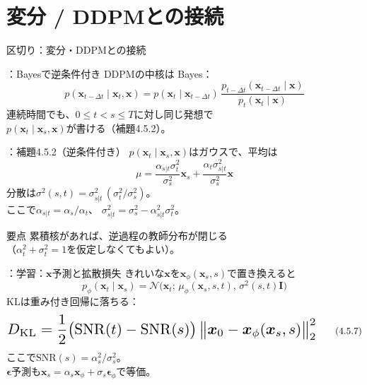 \section{変分 / DDPMとの接続}
\assuppl
\begin{frame}{区切り：\supplmark\;変分・DDPMとの接続}
    \tableofcontents[currentsection]
\end{frame}
\assuppl
\begin{frame}{\supplmark：Bayesで逆条件付き}
    DDPMの中核は Bayes：
    \[
        p(\bm{x}_{t-\Delta t}\mid\bm{x}_t,\bm{x})
        =
        p(\bm{x}_t\mid\bm{x}_{t-\Delta t})\,
        \dfrac{p_{t-\Delta t}(\bm{x}_{t-\Delta t}\mid\bm{x})}{p_t(\bm{x}_t\mid\bm{x})}
        \tag{4.5.3}
    \]
    連続時間でも、$0\le t<s\le T$に対し同じ発想で\\
    $p(\bm{x}_t\mid\bm{x}_s,\bm{x})$が書ける（補題4.5.2）。
\end{frame}
\assuppl
\begin{frame}{\supplmark：補題4.5.2（逆条件付き）}
    $p(\bm{x}_t\mid\bm{x}_s,\bm{x})$はガウスで、平均は
    \[
        \mu
        =
        \dfrac{\alpha_{s|t}\sigma_t^{2}}{\sigma_s^{2}}\bm{x}_s
        +
        \dfrac{\alpha_t\sigma_{s|t}^{2}}{\sigma_s^{2}}\bm{x}
    \]
    分散は$\sigma^{2}(s,t)=\sigma_{s|t}^{2}\,(\sigma_t^{2}/\sigma_s^{2})$。\\
    ここで$\alpha_{s|t}=\alpha_s/\alpha_t$、
    $\sigma_{s|t}^{2}=\sigma_s^{2}-\alpha_{s|t}^{2}\sigma_t^{2}$。
    \begin{exampleblock}{要点}
        累積核があれば、逆過程の教師分布が閉じる\\
        （$\alpha_t^{2}+\sigma_t^{2}=1$を仮定しなくてもよい）。
    \end{exampleblock}
\end{frame}
\assuppl
\begin{frame}{\supplmark：学習：$\bm{x}$予測と拡散損失}
    きれいな$\bm{x}$を$\bm{x}_\phi(\bm{x}_s,s)$で置き換えると
    \[
        p_\phi(\bm{x}_t\mid\bm{x}_s)
        =
        \mathcal{N}\bigl(\bm{x}_t;\,\mu_\phi(\bm{x}_s,s,t),\,\sigma^{2}(s,t)\bm{I}\bigr)
        \tag{4.5.6}
    \]
    KLは重み付き回帰に落ちる：
    \[
        \resizebox{0.95\textwidth}{!}{$
        D_{\mathrm{KL}}
        =
        \dfrac12\bigl(\mathrm{SNR}(t)-\mathrm{SNR}(s)\bigr)
        \,\bigl\|\bm{x}_0-\bm{x}_\phi(\bm{x}_s,s)\bigr\|_{2}^{2}
        $}
        \tag{4.5.7}
    \]
    ここで$\mathrm{SNR}(s)=\alpha_s^{2}/\sigma_s^{2}$。\\
    $\bm{\epsilon}$予測も$\bm{x}_s=\alpha_s\bm{x}_\phi+\sigma_s\bm{\epsilon}_\phi$で等価。
\end{frame}

